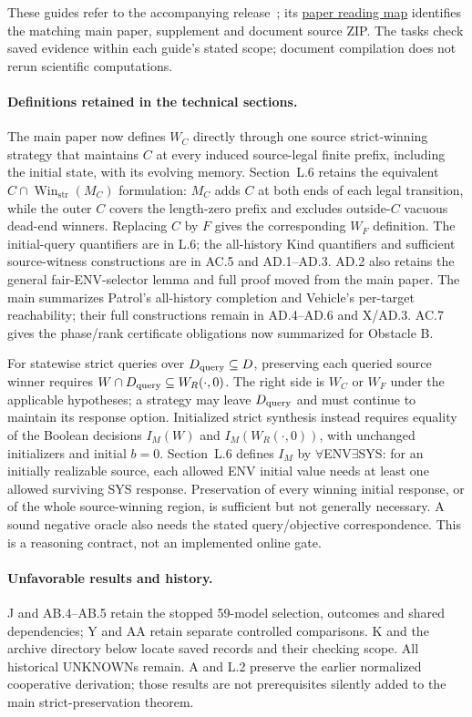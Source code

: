 These guides refer to the accompanying release~\cite{artifactrepository};
its \href{https://github.com/research-artifact-archive/seams2027/blob/controller-replacement-audit-20261026-v10/paper/README.md}{paper reading map}
identifies the matching main paper, supplement and document source ZIP.
The tasks check saved evidence within each guide's stated scope; document
compilation does not rerun scientific computations.

\paragraph{Definitions retained in the technical sections.}
The main paper now defines $W_C$ directly through one source strict-winning
strategy that maintains $C$ at every induced source-legal finite prefix,
including the initial state, with its evolving memory. Section~L.6 retains
the equivalent $C\cap\operatorname{Win}_{\mathrm{str}}(M_C)$ formulation:
$M_C$ adds $C$ at both ends of each legal transition, while the outer $C$
covers the length-zero prefix and excludes outside-$C$ vacuous dead-end
winners. Replacing $C$ by $F$ gives the corresponding $W_F$ definition.
The initial-query quantifiers are in L.6; the all-history Kind quantifiers
and sufficient source-witness constructions are in AC.5 and AD.1--AD.3.
AD.2 also retains the general fair-ENV-selector lemma and full proof moved
from the main paper.
The main summarizes Patrol's all-history completion and Vehicle's per-target
reachability; their full constructions remain in AD.4--AD.6 and X/AD.3.
AC.7 gives the phase/rank certificate obligations now summarized for Obstacle B.

For statewise strict queries over $D_{\rm query}\subseteq D$, preserving
each queried source winner requires
$W\cap D_{\rm query}\subseteq W_R(\cdot,0)$.
The right side is $W_C$ or $W_F$ under the applicable hypotheses; a
strategy may leave $D_{\rm query}$ and must continue to maintain its response
option. Initialized strict synthesis instead requires equality of the Boolean
decisions $I_M(W)$ and $I_M(W_R(\cdot,0))$, with unchanged initializers and
initial $b=0$. Section~L.6 defines $I_M$ by $\forall$ENV$\exists$SYS:
for an initially realizable source, each allowed ENV initial value needs
at least one allowed surviving SYS response. Preservation of every winning
initial response, or of the whole source-winning region, is sufficient
but not generally necessary. A sound negative oracle also needs the stated
query/objective correspondence. This is a reasoning contract, not an
implemented online gate.

\paragraph{Unfavorable results and history.}
J and AB.4--AB.5 retain the stopped 59-model selection, outcomes and shared
dependencies; Y and AA retain separate controlled comparisons. K and the
archive directory below locate saved records and their checking scope.
All historical UNKNOWNs remain. A and L.2 preserve the earlier normalized
cooperative derivation; those results are not prerequisites silently added
to the main strict-preservation theorem.

